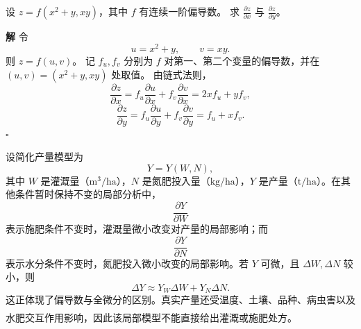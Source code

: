 \documentclass[fontset=fandol]{ctexart}
\newenvironment{solution}{\par\noindent\textbf{解}\quad}{\hfill$\square$\par\vspace{0.8em}}
\newcommand{\upcite}[1]{\textsuperscript{\textsuperscript{\cite{#1}}}}
\begin{document}
\begin{example}[二元复合函数偏导]
设 $z=f(x^2+y,xy)$，其中 $f$ 有连续一阶偏导数。 求 $\frac{\partial z}{\partial x}$ 与 $\frac{\partial z}{\partial y}$。
\end{example}
\begin{solution}
令
\[
u=x^2+y,\qquad v=xy.
\]
则 $z=f(u,v)$。 记 $f_u,f_v$ 分别为 $f$ 对第一、第二个变量的偏导数，并在 $(u,v)=(x^2+y,xy)$ 处取值。 由链式法则，
\[
\frac{\partial z}{\partial x}
=f_u\frac{\partial u}{\partial x}+f_v\frac{\partial v}{\partial x}
=2x f_u+y f_v,
\]
\[
\frac{\partial z}{\partial y}
=f_u\frac{\partial u}{\partial y}+f_v\frac{\partial v}{\partial y}
=f_u+x f_v.
\]
\end{solution}



\begin{application}[作物产量对水分和氮肥的敏感性]
设简化产量模型为
\[
Y=Y(W,N),
\]
其中 $W$ 是灌溉量（$\mathrm{m^3/ha}$），$N$ 是氮肥投入量（$\mathrm{kg/ha}$），$Y$ 是产量（$\mathrm{t/ha}$）。在其他条件暂时保持不变的局部分析中，
\[
\frac{\partial Y}{\partial W}
\]
表示施肥条件不变时，灌溉量微小改变对产量的局部影响；而
\[
\frac{\partial Y}{\partial N}
\]
表示水分条件不变时，氮肥投入微小改变的局部影响。若 $Y$ 可微，且 $\Delta W,\Delta N$ 较小，则
\[
\Delta Y\approx Y_W\Delta W+Y_N\Delta N.
\]
这正体现了偏导数与全微分的区别。真实产量还受温度、土壤、品种、病虫害以及水肥交互作用影响，因此该局部模型不能直接给出灌溉或施肥处方。\upcite{TaizPlant}
\end{application}
\end{document}
